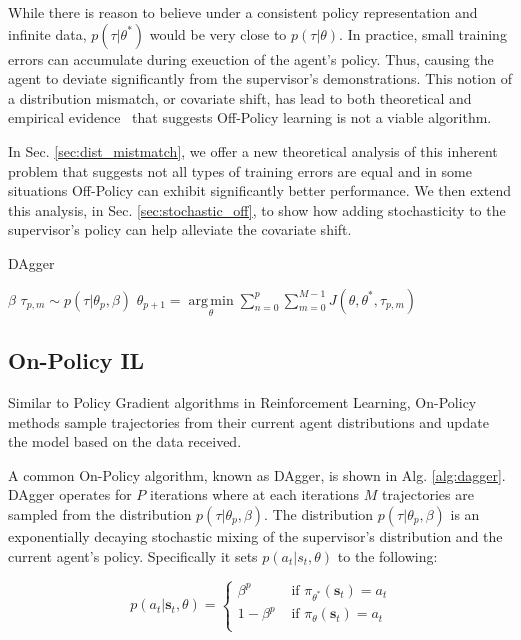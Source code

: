 \documentclass[conference]{article}
\DeclareMathOperator*{\argmin}{arg\,min}
\newcommand{\bs}{\mathbf{s}}
\begin{document}
 While there is reason to believe under a consistent policy representation and infinite data, $p(\tau|\theta^*)$ would be very close to $p(\tau|\theta)$.  In practice, small training errors can accumulate during exeuction of the agent's policy. Thus, causing the agent to deviate significantly from the supervisor's demonstrations. This notion of a distribution mismatch, or covariate shift,  has lead to both theoretical and empirical evidence~\cite{ross2010reduction} that suggests Off-Policy learning is not a viable algorithm. 

In Sec. \ref{sec:dist_mistmatch}, we offer a new theoretical analysis of this inherent problem that suggests not all types of training errors are equal and in some situations Off-Policy can exhibit significantly better performance. We then  extend this analysis, in  Sec. \ref{sec:stochastic_off}, to show how adding stochasticity to the supervisor's policy can  help alleviate the covariate shift.



\begin{algorithm}[tb]
   \caption{DAgger}
   \label{alg:dagger}
\begin{algorithmic}
    $\beta$
   		   \STATE $\tau_{p,m} \sim p(\tau|\theta_p,\beta)$
   		\ENDFOR
   	\STATE $\theta_{p+1} = \underset{\theta}{\argmin} \sum_{n=0}^p \sum_{m=0}^{M-1} J(\theta,\theta^*,\tau_{p,m})$
   	\ENDFOR
\end{algorithmic}
\end{algorithm}

\subsection{On-Policy IL} Similar to Policy Gradient algorithms in Reinforcement Learning, On-Policy methods sample trajectories from their current agent  distributions and update the model based on the data received. 

A common On-Policy algorithm, known as DAgger, is shown in Alg. \ref{alg:dagger}. DAgger operates for $P$ iterations where at each iterations $M$ trajectories are sampled from the distribution $p(\tau|\theta_p,\beta)$. The distribution $p(\tau|\theta_p,\beta)$ is an exponentially decaying stochastic mixing of the supervisor's distribution and the current agent's policy. Specifically it sets $p(a_t|s_t,\theta)$ to the following: 

\[
\ p(a_t|\bs_t,\theta) =
\left\{
\!
\begin{aligned}
\beta^p & \text{ if } \pi_{\theta^*}(\bs_t) = a_t\\
1-\beta^p  & \text{ if } \pi_\theta(\bs_t) = a_t\\
\end{aligned}
\right.
\]
\end{document}
